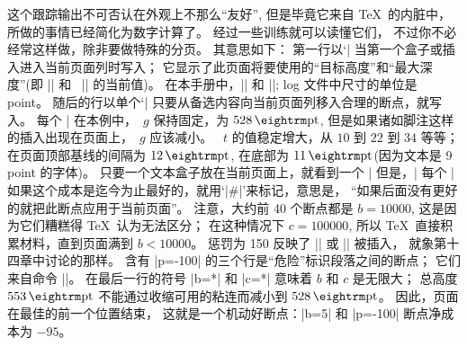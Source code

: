 \endtt
\1这个跟踪输出不可否认在外观上不那么``友好'',
但是毕竟它来自 \TeX\ 的内脏中，所做的事情已经简化为数字计算了。%
经过一些训练就可以读懂它们，
不过你不必经常这样做，除非要做特殊的分页。%
其意思如下：
第一行以`|%
当第一个盒子或插入进入当前页面列时写入；
它显示了此页面将要使用的``目标高度''和``最大深度''(即 |\vsize| 和%
~|\maxdepth| 的当前值)。%
在本手册中，|\vsize=44pc| 和 |\maxdepth=2.2pt|;
log 文件中尺寸的单位是 point。%
随后的行以单个`|%
只要从备选内容向当前页面列移入合理的断点，就写入。%
每个 |%
在本例中，~$g$ 保持固定，为 $528\pt$,
但是如果诸如脚注这样的插入出现在页面上，~$g$ 应该减小。%
~$t$ 的值稳定增大，从 $10$ 到 $22$ 到 $34$ 等等；
在页面顶部基线的间隔为 $12\pt$, 在底部为 $11\pt$(因为文本是 9 point 的字体)。%
只要一个文本盒子放在当前页面上，就看到一个 |%
但是，|%
每个 |%
如果这个成本是迄今为止最好的，就用`|#|'来标记，意思是，
``如果后面没有更好的就把此断点应用于当前页面''。%
注意，大约前 40 个断点都是 $b=10000$, 这是因为它们糟糕得 \TeX\ 认为无法区分；
在这种情况下 $c=100000$,
所以 \TeX\ 直接积累材料，直到页面满到 $b<10000$。%
惩罚为 150 反映了 |\clubpenalty| 或 |\widowpenalty| 被插入，
就象第十四章中讨论的那样。%
含有 |p=-100| 的三个行是``危险''标识段落之间的断点；
它们来自命令 |\medbreak|。%
在最后一行的符号 |b=*| 和 |c=*| 意味着 $b$ 和 $c$ 是无限大；
总高度 $553\pt$ 不能通过收缩可用的粘连而减小到 $528\pt$。%
因此，页面在最佳的前一个位置结束，
这就是一个机动好断点：|b=5| 和 |p=-100| 断点净成本为 $-95$。

